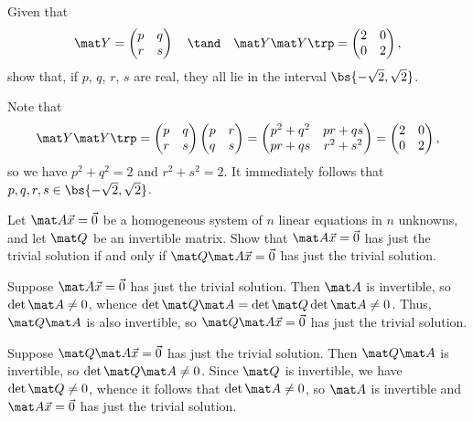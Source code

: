 \begin{problem}
    Given that \[\mat Y = \begin{pmatrix}p & q \\ r & s\end{pmatrix} \quad \tand \quad \mat Y \mat Y \trp = \begin{pmatrix}2 & 0 \\ 0 & 2 \end{pmatrix},\] show that, if $p$, $q$, $r$, $s$ are real, they all lie in the interval $\bs{-\sqrt2, \sqrt2}$.
\end{problem}
\begin{solution}
    Note that \[\mat Y \mat Y \trp = \begin{pmatrix}p & q \\ r & s\end{pmatrix} \begin{pmatrix}p & r \\ q & s\end{pmatrix} = \begin{pmatrix}p^2 + q^2 & pr + qs \\ pr + qs & r^2 + s^2\end{pmatrix} = \begin{pmatrix}2 & 0 \\ 0 & 2 \end{pmatrix},\] so we have $p^2 + q^2 = 2$ and $r^2 + s^2 = 2$. It immediately follows that $p, q, r, s \in \bs{-\sqrt2, \sqrt2}$.
\end{solution}

\begin{problem}
    Let $\mat A \vec x = \vec 0$ be a homogeneous system of $n$ linear equations in $n$ unknowns, and let $\mat Q$ be an invertible matrix. Show that $\mat A \vec x = \vec 0$ has just the trivial solution if and only if $\mat Q \mat A \vec x = \vec 0$ has just the trivial solution.
\end{problem}
\begin{solution}
    Suppose $\mat A \vec x = \vec 0$ has just the trivial solution. Then $\mat A$ is invertible, so $\det \mat A \neq 0$, whence $\det{\mat Q \mat A} = \det{\mat Q} \det{\mat A} \neq 0$. Thus, $\mat Q \mat A$ is also invertible, so $\mat Q \mat A \vec x = \vec 0$ has just the trivial solution.

    Suppose $\mat Q \mat A \vec x = \vec 0$ has just the trivial solution. Then $\mat Q \mat A$ is invertible, so $\det{\mat Q \mat A} \neq 0$. Since $\mat Q$ is invertible, we have $\det{\mat Q} \neq 0$, whence it follows that $\det{\mat A} \neq 0$, so $\mat A$ is invertible and $\mat A \vec x = \vec 0$ has just the trivial solution.
\end{solution}

